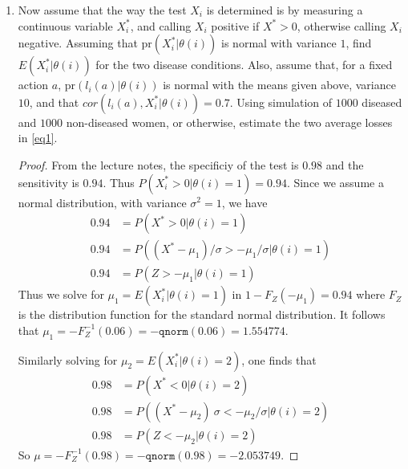 \documentclass[letterpaper,12pt]{article}
\begin{document}
\begin{enumerate}[(1)]
\begin{proof}
Let's examine 1. For an action $a$, the loss $l_i(a)$ is constant within women of common disease status $\theta(i)$. Since, for example,  $E\{l_i(a_1)| \theta(i) = 1\} = 2$, it must be that $l_i(a_1)$ given $\theta(i) =1$ is $2$ for all $i$. Otherwise, if $l_i(a_1)$ were some other value, $c \neq 2$, then the expected value would be $c$. In other words, we have $l_i (s(X_i)) = l(\theta(i), s(X_i))$, since $s(X_i)$ is the same on both sides of the equal sign and $\theta(i)$ is captured in $l_i$. Since we have that equality, taking expectations over subsets of people with true status $\theta(i)$ will yield equal values.

Now 2. And 3.
\end{proof}

\item
Now assume that the way the test $X_i$ is determined is by measuring a continuous variable $X_i^*$, and calling $X_i$ positive if $X^* > 0$, otherwise calling $X_i$ negative. Assuming that pr$(X_i^* | \theta(i))$ is normal with variance $1$, find $E(X_i^*|\theta(i))$ for the two disease conditions. 
Also, assume that, for a fixed action $a$, pr$(l_i(a) | \theta(i))$ is normal with the means given above, variance $10$, and that $cor(l_i(a),X_i^*|\theta(i))=0.7$.
 Using simulation of $1000$ 	diseased and $1000$ non-diseased women, or otherwise, estimate the two average losses in \eqref{eq1}.

\begin{proof}
From the lecture notes, the specificiy of the test is $0.98$ and the sensitivity is $0.94$. Thus $P( X_i^* > 0 | \theta(i) = 1) = 0.94$. Since we assume a normal distribution, with variance $\sigma^2 = 1$, we have
\begin{align*}
0.94 &= P( X^* > 0 | \theta(i) = 1) \\
0.94 &= P( (X^* - \mu_1) / \sigma > -\mu_1/ \sigma | \theta(i) = 1) \\
0.94 &= P( Z > -\mu_1 | \theta(i) = 1)
\end{align*}
Thus we solve for $\mu_1 = E(X_i^* | \theta(i)=1)$ in $1 - F_Z(-\mu_1) = 0.94$ where $F_Z$ is the distribution function for the standard normal distribution. It follows that $\mu_1 = -F_Z^{-1} (0.06) = - \texttt{qnorm}(0.06) = 1.554774$. 

Similarly solving for $\mu_2 = E(X_i^* | \theta(i) = 2)$, one finds that
\begin{align*}
0.98 &= P(X^* < 0 | \theta(i) = 2) \\
0.98 &= P((X^* - \mu_2) \ \sigma < -\mu_2 / \sigma | \theta(i) = 2) \\
0.98 &= P( Z < -\mu_2 | \theta(i) = 2)
\end{align*}
So $\mu = -F_Z^{-1}(0.98) = -\texttt{qnorm}(0.98) = -2.053749$.


\end{proof}
\end{enumerate}
\end{document}
